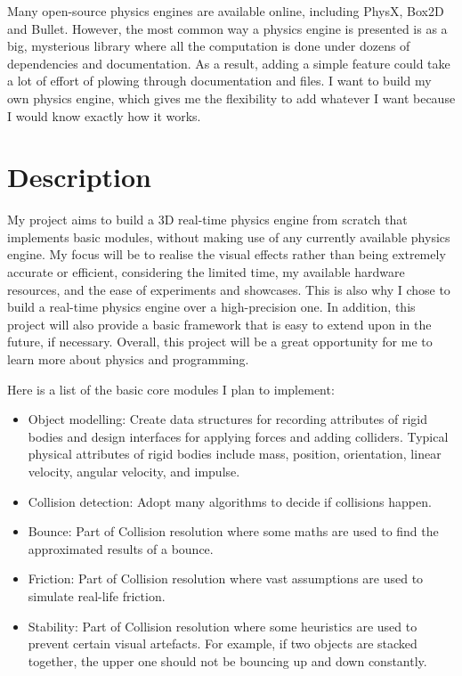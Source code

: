 \documentclass[12pt]{article}
\begin{document}
Many open-source physics engines are available online, including PhysX\cite{physx}, 
Box2D\cite{box2d} and Bullet\cite{bullet}.
However, the most common way a physics engine is presented is as a big, mysterious library 
where all the computation is done under dozens of dependencies and documentation.
As a result, adding a simple feature could take a lot of effort of plowing through documentation and files.
I want to build my own physics engine, 
which gives me the flexibility to add whatever I want because I would know exactly how it works.

\section{Description}

My project aims to build a 3D real-time physics engine from scratch that implements basic modules, 
without making use of any currently available physics engine.
My focus will be to realise the visual effects rather than being extremely accurate or efficient,
considering the limited time, my available hardware resources, and the ease of experiments and showcases.
This is also why I chose to build a real-time physics engine over a high-precision one.
In addition, this project will also provide a basic framework that is easy to extend upon in the future, if necessary.
Overall, this project will be a great opportunity for me to learn more about physics and programming.

Here is a list of the basic core modules I plan to implement:
\begin{itemize}
\item Object modelling: Create data structures for recording attributes of rigid bodies and design interfaces for applying forces and adding colliders.
Typical physical attributes of rigid bodies include mass, position, orientation, linear velocity, angular velocity, and impulse.
\item Collision detection: Adopt many algorithms to decide if collisions happen.
\item Bounce: Part of Collision resolution where some maths are used to find the approximated results of a bounce.
\item Friction: Part of Collision resolution where vast assumptions are used to simulate real-life friction.
\item Stability: Part of Collision resolution where some heuristics are used to prevent certain visual artefacts.
For example, if two objects are stacked together, the upper one should not be bouncing up and down constantly.
\end{itemize}
\end{document}
